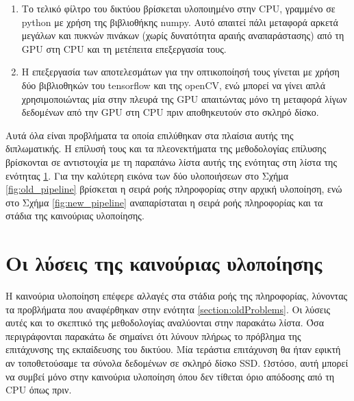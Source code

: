 \begin{enumerate}
\item{Το τελικό φίλτρο του δικτύου βρίσκεται υλοποιημένο στην CPU, γραμμένο σε python με χρήση της βιβλιοθήκης numpy. Αυτό απαιτεί πάλι μεταφορά αρκετά μεγάλων και πυκνών πινάκων (χωρίς δυνατότητα αραιής αναπαράστασης) από τη GPU στη CPU και τη μετέπειτα επεξεργασία τους.}
\item{Η επεξεργασία των αποτελεσμάτων για την οπτικοποίησή τους γίνεται με χρήση δύο βιβλιοθηκών του tensorflow και της openCV, ενώ μπορεί να γίνει απλά χρησιμοποιώντας μία στην πλευρά της GPU απαιτώντας μόνο τη μεταφορά λίγων δεδομένων από την GPU στη CPU πριν αποθηκευτούν στο σκληρό δίσκο.}
\end{enumerate}

Αυτά όλα είναι προβλήματα τα οποία επιλύθηκαν στα πλαίσια αυτής της διπλωματικής. Η επίλυσή τους και τα πλεονεκτήματα της μεθοδολογίας επίλυσης βρίσκονται σε αντιστοιχία με τη παραπάνω λίστα αυτής της ενότητας στη λίστα της ενότητας \ref{section:new_solutions}. Για την καλύτερη εικόνα των δύο υλοποιήσεων στο Σχήμα \ref{fig:old_pipeline} βρίσκεται η σειρά ροής πληροφορίας στην αρχική υλοποίηση, ενώ στο Σχήμα \ref{fig:new_pipeline} αναπαρίσταται η σειρά ροής πληροφορίας και τα στάδια της καινούριας υλοποίησης.

\section{Οι λύσεις της καινούριας υλοποίησης}
\label{section:new_solutions}
Η καινούρια υλοποίηση επέφερε αλλαγές στα στάδια ροής της πληροφορίας, λύνοντας τα προβλήματα που αναφέρθηκαν στην ενότητα \ref{section:oldProblems}. Οι λύσεις αυτές και το σκεπτικό της μεθοδολογίας αναλύονται στην παρακάτω λίστα. Όσα περιγράφονται παρακάτω δε σημαίνει ότι λύνουν πλήρως το πρόβλημα της επιτάχυνσης της εκπαίδευσης του δικτύου. Μία τεράστια επιτάχυνση θα ήταν εφικτή αν τοποθετούσαμε τα σύνολα δεδομένων σε σκληρό δίσκο SSD. Ωστόσο, αυτή μπορεί να συμβεί μόνο στην καινούρια υλοποίηση όπου δεν τίθεται όριο απόδοσης από τη CPU όπως πριν.

